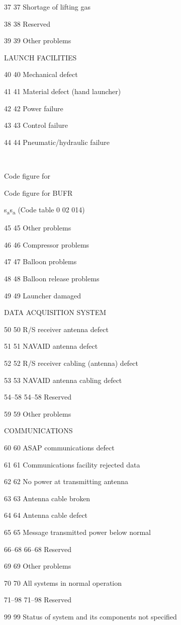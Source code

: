 37 37 Shortage of lifting gas

38 38 Reserved

39 39 Other problems

LAUNCH FACILITIES

40 40 Mechanical defect

41 41 Material defect (hand launcher)

42 42 Power failure

43 43 Control failure

44 44 Pneumatic/hydraulic failure

\textbf{\\
}

Code figure for

Code figure for BUFR

s\textsubscript{a}s\textsubscript{a} (Code table 0 02 014)

45 45 Other problems

46 46 Compressor problems

47 47 Balloon problems

48 48 Balloon release problems

49 49 Launcher damaged

DATA ACQUISITION SYSTEM

50 50 R/S receiver antenna defect

51 51 NAVAID antenna defect

52 52 R/S receiver cabling (antenna) defect

53 53 NAVAID antenna cabling defect

54--58 54--58 Reserved

59 59 Other problems

COMMUNICATIONS

60 60 ASAP communications defect

61 61 Communications facility rejected data

62 62 No power at transmitting antenna

63 63 Antenna cable broken

64 64 Antenna cable defect

65 65 Message transmitted power below normal

66--68 66--68 Reserved

69 69 Other problems

70 70 All systems in normal operation

71--98 71--98 Reserved

99 99 Status of system and its components not specified

